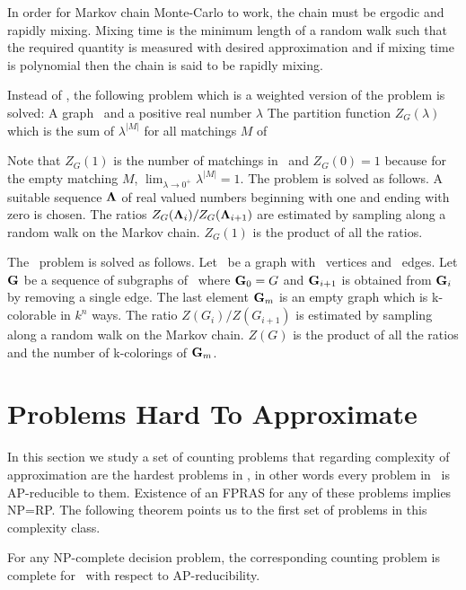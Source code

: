 In order for Markov chain Monte-Carlo to work, the chain must be ergodic and rapidly mixing.
Mixing time is the minimum length of a random walk such that the required
quantity is measured with desired approximation and if mixing
time is polynomial then the chain is said to be rapidly mixing.

Instead of , the following problem which is a weighted version of
the  problem is solved:
{A graph \mG\ and a positive real number \(\lambda\)}
{The partition function \(Z_G(\lambda)\) which is the sum of
\(\lambda^{|M|}\) for all matchings \(M\) of \mG}

Note that \(Z_G(1)\) is the number of matchings in \mG\ and \(Z_G(0)=1\) because
for the empty matching \(M\), \(\lim_{\lambda\to 0^+}\lambda^{|M|}=1\).
The  problem is solved as follows.
A suitable sequence \(\mathbf{\Lambda}\) of real valued numbers beginning with one and ending
with zero is chosen. The ratios \(Z_G(\mathbf{\Lambda}_i)/Z_G(\mathbf{\Lambda}_{i+1})\) are estimated 
by sampling along a random walk on the Markov chain. \(Z_G(1)\) is the product of
all the ratios.

The \ldkcol\ problem is solved as follows. Let \mG\ be a graph with \mn\ vertices
and \mm\ edges. Let \(\mathbf{G}\) be a sequence of subgraphs of \mG\ where
\(\mathbf{G}_0=G\) and \(\mathbf{G}_{i+1}\) is obtained from \(\mathbf{G}_i\) by removing a single edge. 
The last element \(\mathbf{G}_m\) is an empty graph which is k-colorable in \(k^n\) ways.
The ratio \(Z(G_i)/Z(G_{i+1})\) is estimated
by sampling along a random walk on the Markov chain. \(Z(G)\) is the product of all the
ratios and the number of k-colorings of \(\mathbf{G}_m\).


\section{Problems Hard To Approximate} \label{sec:hard}
In this section we study a set of counting problems that regarding complexity
of approximation are the hardest problems in \cp, in other words every
problem in \cp\ is AP-reducible to them.
Existence of an FPRAS for any of these problems implies NP=RP\@. The following theorem 
points us to the first set of problems in this complexity class.

\begin{theorem} 
For any NP-complete decision problem, the corresponding counting problem is complete
for \cp\ with respect to AP-reducibility.
\end{theorem}

